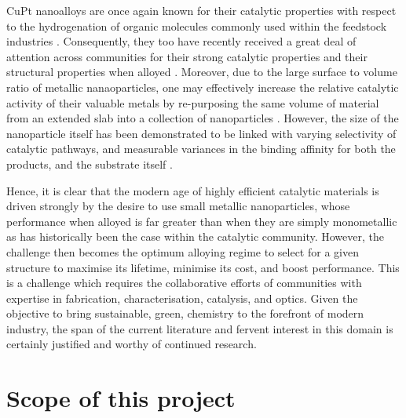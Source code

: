CuPt nanoalloys are once again known for their catalytic properties with respect to the hydrogenation of organic molecules commonly used within the feedstock industries \cite{Taylor2021,Shiraishi2013}. Consequently, they too have recently received a great deal of attention across communities for their strong catalytic properties and their structural properties when alloyed \cite{Zheng2013,https://doi.org/10.1002/chem.201905672}. Moreover, due to the large surface to volume ratio of metallic nanaoparticles, one may effectively increase the relative catalytic activity of their valuable metals by re-purposing the same volume of material from an extended slab into a collection of nanoparticles \cite{doi:10.1021/acs.chemrev.8b00696,doi:10.1021/acs.chemrev.9b00220}. However, the size of the nanoparticle itself has been demonstrated to be linked with varying selectivity of catalytic pathways, and measurable variances in the binding affinity for both the products, and the substrate itself \cite{doi:10.1021/ja904307n}.

Hence, it is clear that the modern age of highly efficient catalytic materials is driven strongly by the desire to use small metallic nanoparticles, whose performance when alloyed is far greater than when they are simply monometallic as has historically been the case within the catalytic community. However, the challenge then becomes the optimum alloying regime to select for a given structure to maximise its lifetime, minimise its cost, and boost performance. This is a challenge which requires the collaborative efforts of communities with expertise in fabrication, characterisation, catalysis, and optics. Given the objective to bring sustainable, green, chemistry to the forefront of modern industry, the span of the current literature and fervent interest in this domain is certainly justified and worthy of continued research.


\section{Scope of this project}
\label{sec:scope}

